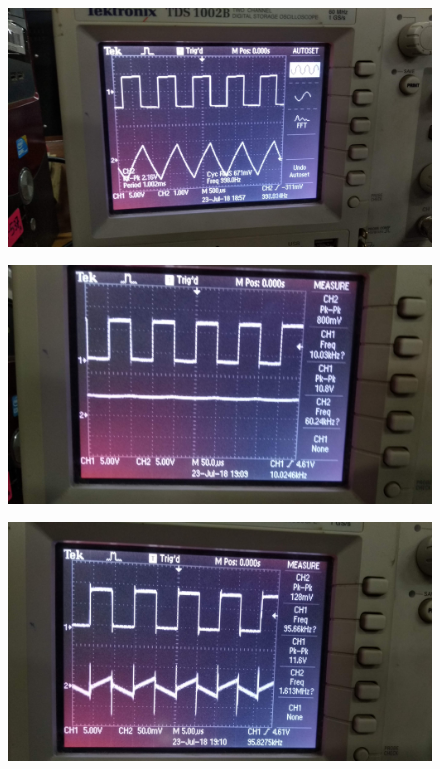 \documentclass[12pt]{article}
\begin{document}
\begin{figure}
\centering
\includegraphics[scale = 0.08]{1000hz.jpg}
\end{figure}

\begin{figure}
\centering
\includegraphics[scale = 0.08]{10khz.jpg}
\end{figure}

\begin{figure}
\centering
\includegraphics[scale = 0.08]{ac-coupling.jpg}
\end{figure}
\end{document}
